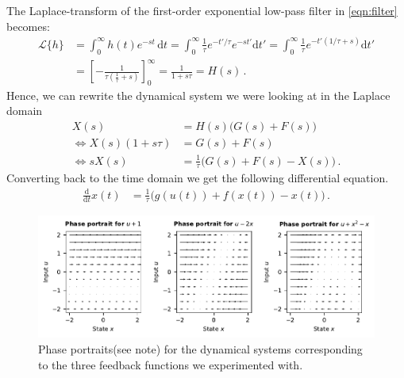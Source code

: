 \documentclass[10pt,letterpaper,oneside]{article}
\begin{document}
The Laplace-transform of the first-order exponential low-pass filter in \cref{eqn:filter} becomes:
\begin{align*}
	\mathcal{L}\{h\}
	    &=  \int_{0}^\infty h(t) e^{-st} \,\mathrm{d}t
		 =  \int_{0}^{\infty} \frac{1}{\tau} e^{-t'/\tau} e^{-st'} \mathrm{d}t' 
		 =  \int_{0}^{\infty} \frac{1}{\tau} e^{-t'(1/\tau + s)} \mathrm{d}t' \\
		&=  \left[ -\frac{1}{\tau \left( \frac{1}{\tau} + s \right)} \right]_0^\infty
		 =  \frac{1}{1 + s\tau}
		 =  H(s) \,.
\end{align*}
Hence, we can rewrite the dynamical system we were looking at in the Laplace domain
\begin{align*}
	X(s) &= H(s) \big(G(s) + F(s) \big)  \\
	\Leftrightarrow X(s) (1 + s \tau) &= G(s) + F(s) \\
	\Leftrightarrow s X(s) &= \frac{1}{\tau} \big(G(s) + F(s) - X(s)\big) \,.
\end{align*}
Converting back to the time domain we get the following differential equation.
\begin{align*}
	\frac{\mathrm{d}}{\mathrm{d}t} x(t) &= \frac{1}{\tau} \big(g(u(t)) + f(x(t)) - x(t) \big) \,.
\end{align*}

\begin{figure}
	\centering
	\includegraphics{media/phase_portraits.pdf}
	\caption{Phase portraits(see note) for the dynamical systems corresponding to the three feedback functions we experimented with.}
	\label{fig:phase_portraits}
\end{figure}
\end{document}
